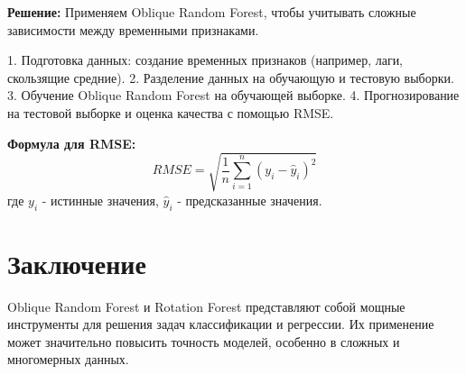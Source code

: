 \textbf{Решение:}
Применяем Oblique Random Forest, чтобы учитывать сложные зависимости между временными признаками.

1. Подготовка данных: создание временных признаков (например, лаги, скользящие средние).
2. Разделение данных на обучающую и тестовую выборки.
3. Обучение Oblique Random Forest на обучающей выборке.
4. Прогнозирование на тестовой выборке и оценка качества с помощью RMSE.

\textbf{Формула для RMSE:}
\[
RMSE = \sqrt{\frac{1}{n} \sum_{i=1}^{n} (y_i - \hat{y}_i)^2}
\]
где \(y_i\) - истинные значения, \(\hat{y}_i\) - предсказанные значения.

\section{Заключение}
Oblique Random Forest и Rotation Forest представляют собой мощные инструменты для решения задач классификации и регрессии. Их применение может значительно повысить точность моделей, особенно в сложных и многомерных данных.


